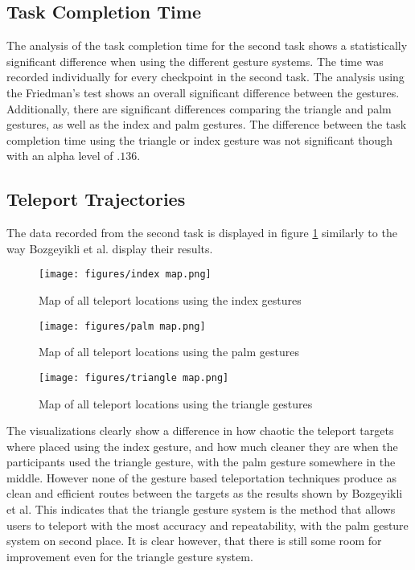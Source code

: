 \subsection{Task Completion Time}
The analysis of the task completion time for the second task shows a statistically significant difference when using the different gesture systems. The time was recorded individually for every checkpoint in the second task. The analysis using the Friedman’s test shows an overall significant difference between the gestures. Additionally, there are significant differences comparing the triangle and palm gestures, as well as the index and palm gestures. The difference between the task completion time using the triangle or index gesture was not significant though with an alpha level of $.136$.


\subsection{Teleport Trajectories}
The data recorded from the second task is displayed in figure \ref{fig:exp2maps} similarly to the way Bozgeyikli et al. %
display their results. 

\begin{figure}[!htb]
        \texttt{[image: figures/index map.png]}
        \caption{Map of all teleport locations using the index gestures}\label{fig:map_index}
    \endminipage\hfill
        \texttt{[image: figures/palm map.png]}
        \caption{Map of all teleport locations using the palm gestures}\label{fig:map_palm}
    \endminipage\hfill
        \texttt{[image: figures/triangle map.png]}
        \caption{Map of all teleport locations using the triangle gestures}\label{fig:map_triangle}
        \label{fig:exp2maps}
    \endminipage
\end{figure}
    
The visualizations clearly show a difference in how chaotic the teleport targets where placed using the index gesture, and how much cleaner they are when the participants used the triangle gesture, with the palm gesture somewhere in the middle. However none of the gesture based teleportation techniques produce as clean and efficient routes between the targets as the results shown by Bozgeyikli et al. This indicates that the triangle gesture system is the method that allows users to teleport with the most accuracy and repeatability, with the palm gesture system on second place. It is clear however, that there is still some room for improvement even for the triangle gesture system. 

